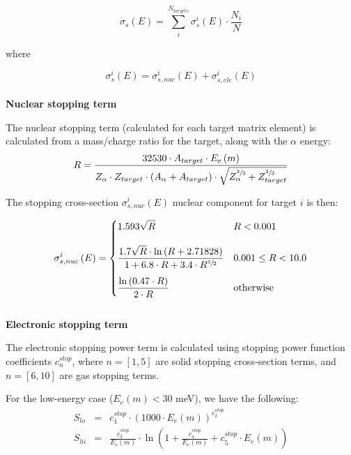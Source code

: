 \documentclass[10pt]{article}
\begin{document}
\begin{equation}
\sigma_s\left(E\right) = \sum_{i}^{N_{targets}} \sigma_s^i\left(E\right) \cdot \frac{N_i}{N}
\end{equation}

where

\begin{equation}
\sigma_s^i\left(E\right) = \sigma_{s,nuc}^i\left(E\right) + \sigma_{s,ele}^i\left(E\right)
\end{equation}
\\

\textbf{Nuclear stopping term}

The nuclear stopping term (calculated for each target matrix element) is calculated from a mass/charge ratio for the target, along with the $\alpha$ energy:
\begin{equation}
\displaystyle R = \frac{32530 \cdot A_{target} \cdot E_e\left(m\right)}{Z_\alpha \cdot Z_{target} \cdot \left(A_\alpha + A_{target} \right) \cdot \sqrt{ Z_\alpha^{\sfrac{2}{3}} + Z_{target}^{\sfrac{2}{3}} } } 
\end{equation}

The stopping cross-section $\sigma_{s,nuc}^i \left(E\right)$ nuclear component for target $i$ is then:

\begin{equation}
\displaystyle \sigma_{s,nuc}^i\left(E\right) = 
\begin{cases}
\displaystyle 1.593 \sqrt{R} & R < 0.001 \\[12pt]
\displaystyle \frac{1.7 \sqrt{R} \cdot \ln \left(R + 2.71828\right)}{1 + 6.8 \cdot R + 3.4 \cdot R^{\sfrac{3}{2}}} & 0.001 \leq R < 10.0 \\[12pt]
\displaystyle \frac{\ln\left(0.47\cdot R\right)}{2\cdot R} & \mathrm{otherwise}
\end{cases}
\end{equation}
\\

\textbf{Electronic stopping term}

The electronic stopping power term is calculated using stopping power function coefficients $c_n^{stop}$, where $n=[1,5]$ are solid stopping cross-section terms, and $n=[6,10]$ are gas stopping terms.

For the low-energy case ($E_e\left(m\right) < 30$ meV), we have the following:
\begin{eqnarray}
S_{lo} & = & c_1^{stop} \cdot \left(1000 \cdot E_e\left(m\right) \right)^{c_2^{stop}} \\
S_{hi} & = & \frac{c_3^{stop}}{E_e\left(m\right)} \cdot \ln \left( 1 + \frac{c_4^{stop}}{E_e\left(m\right)} + c_5^{stop}\cdot E_e\left(m\right) \right) 
\end{eqnarray}
\end{document}
